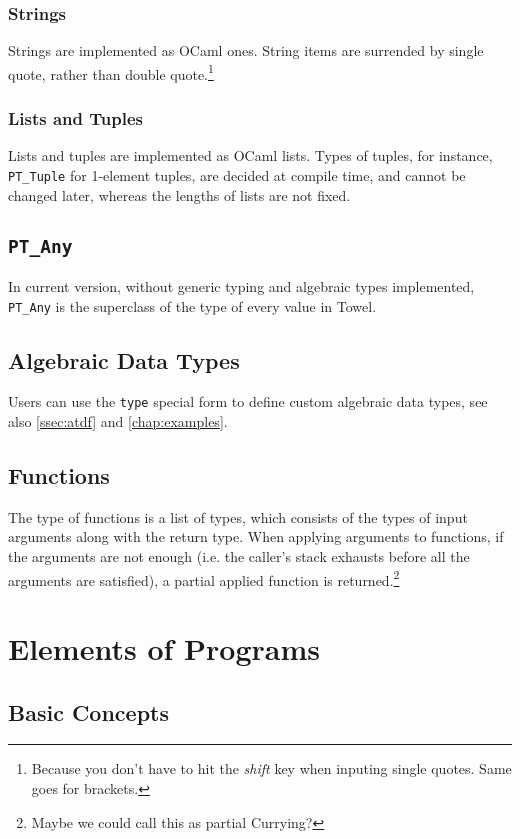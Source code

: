 \documentclass{book}
\begin{document}
\subsection{Strings}
Strings are implemented as OCaml ones. String items are surrended by single quote, rather than double quote.\footnote{Because you don't have to hit the \textit{shift} key when inputing single quotes. Same goes for brackets.}

\subsection{Lists and Tuples}
Lists and tuples are implemented as OCaml lists. Types of tuples, for instance, \texttt{PT\_Tuple} for 1-element tuples, are decided at compile time, and cannot be changed later, whereas the lengths of lists are not fixed.

\section{\texttt{PT\_Any}}
In current version, without generic typing and algebraic types implemented, \texttt{PT\_Any} is the superclass of the type of every value in Towel.

\section{Algebraic Data Types}
Users can use the \texttt{type} special form to define custom algebraic data types, see also \autoref{ssec:atdf} and \autoref{chap:examples}.

\section{Functions}
The type of functions is a list of types, which consists of the types of input arguments along with the return type. When applying arguments to functions, if the arguments are not enough (i.e. the caller's stack exhausts before all the arguments are satisfied), a partial applied function is returned.\footnote{Maybe we could call this as partial Currying?}

\chapter{Elements of Programs}
\label{chap:forms}

\section{Basic Concepts}
\end{document}
